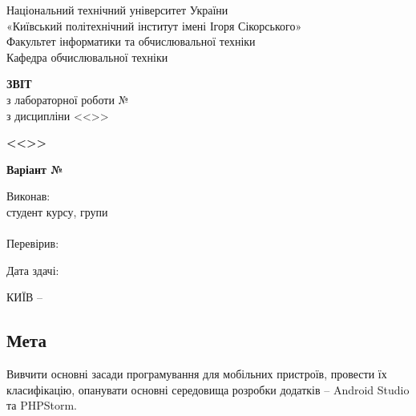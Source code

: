 \documentclass[14pt, a4paper]{extreport}
\begin{document}
	
	\begin{titlepage}
		\begin{center}
			\normalsize
			Національний технічний університет України\\
			«Київський політехнічний інститут імені Ігоря Сікорського» \\[0.5em]
			Факультет інформатики та обчислювальної техніки\\
			Кафедра обчислювальної техніки
			
			\vfill
			
			{\large \textbf{ЗВІТ}\\[0.5em]}
			{з лабораторної роботи №\LabNumber \\}
			{з дисципліни <<\CourseTitle>>}
			
			\vspace{2em}
			
			{\textbf{<<\Topic>>}}
			
			\vspace{1em}
			
			{\textbf{Варіант №\Variant}}
			
			\vfill
			
			\begin{flushright}
				Виконав: \\ студент \CourseNumber{} курсу, групи \StudentGroup \\
				\StudentName \\[1em]
				Перевірив: \\ \Teacher
			\end{flushright}
			
			\vfill
			
			\begin{flushright}
				Дата здачі: \DTMtoday
			\end{flushright}
			
			\vspace{5em}
			КИЇВ -- \ReportYear
		\end{center}
	\end{titlepage}
	
	\clearpage
	\setcounter{page}{2}
	
	\subsection*{Мета} 
	
	Вивчити основні засади програмування для мобільних пристроїв, провести їх класифікацію, опанувати основні середовища розробки додатків -- Android Studio та PHPStorm.
	
\end{document}
